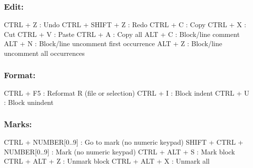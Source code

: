 \subsubsection{Edit:}

\vspace{-0.5cm}
\begin{Rtables}[caption={[Edit menu keyboard shortcuts]
    Edit menu keyboard shortcuts},
  label=menu:edit]
  CTRL + Z                : Undo
  CTRL + SHIFT + Z        : Redo
  CTRL + C                : Copy
  CTRL + X                : Cut
  CTRL + V                : Paste
  CTRL + A                : Copy all
  ALT  + C                : Block/line comment
  ALT  + N                : Block/line uncomment first occurrence
  ALT  + Z                : Block/line uncomment all occurrences
\end{Rtables}


\newpage
\subsubsection{Format:}

\vspace{-0.5cm}
\begin{Rtables}[caption={[Format menu keyboard shortcuts]
    Format menu keyboard shortcuts},
  label=menu:format]
  CTRL + F5               : Reformat R (file or selection)
  CTRL + I                : Block indent
  CTRL + U                : Block unindent
\end{Rtables}


\subsubsection{Marks:}

\vspace{-0.5cm}
\begin{Rtables}[caption={[Marks menu keyboard shortcuts]
    Marks menu keyboard shortcuts},
  label=menu:marks]
  CTRL  + NUMBER[0..9]        : Go to mark (no numeric keypad)
  SHIFT + CTRL + NUMBER[0..9] : Mark (no numeric keypad)
  CTRL  + ALT  + S            : Mark block
  CTRL  + ALT  + Z            : Unmark block
  CTRL  + ALT  + X            : Unmark all
\end{Rtables}



